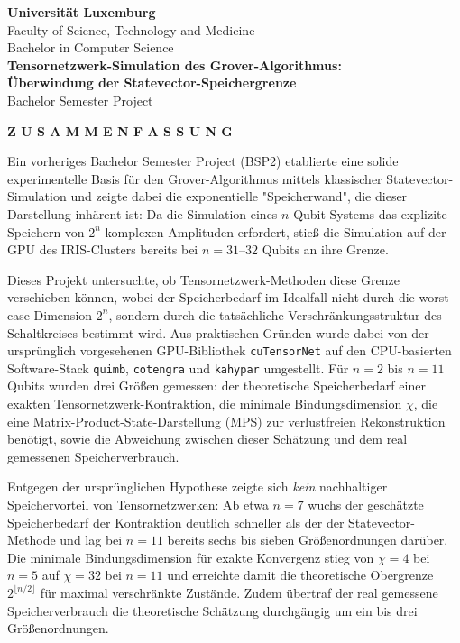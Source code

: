 \documentclass[a4paper,11pt]{article}
\begin{document}
\begin{center}
\textbf{Universität Luxemburg} \\
Faculty of Science, Technology and Medicine \\
Bachelor in Computer Science \\[1em]
\textbf{Tensornetzwerk-Simulation des Grover-Algorithmus: \\
Überwindung der Statevector-Speichergrenze} \\
Bachelor Semester Project
\end{center}

\vspace{1em}
\begin{center}\textbf{Z U S A M M E N F A S S U N G}\end{center}

Ein vorheriges Bachelor Semester Project (BSP2) etablierte eine solide experimentelle Basis für den Grover-Algorithmus mittels klassischer Statevector-Simulation und zeigte dabei die exponentielle "Speicherwand", die dieser Darstellung inhärent ist: Da die Simulation eines $n$-Qubit-Systems das explizite Speichern von $2^n$ komplexen Amplituden erfordert, stieß die Simulation auf der GPU des IRIS-Clusters bereits bei $n=31$–$32$ Qubits an ihre Grenze.

Dieses Projekt untersuchte, ob Tensornetzwerk-Methoden diese Grenze verschieben können, wobei der Speicherbedarf im Idealfall nicht durch die worst-case-Dimension $2^n$, sondern durch die tatsächliche Verschränkungsstruktur des Schaltkreises bestimmt wird. Aus praktischen Gründen wurde dabei von der ursprünglich vorgesehenen GPU-Bibliothek \texttt{cuTensorNet} auf den CPU-basierten Software-Stack \texttt{quimb}, \texttt{cotengra} und \texttt{kahypar} umgestellt. Für $n=2$ bis $n=11$ Qubits wurden drei Größen gemessen: der theoretische Speicherbedarf einer exakten Tensornetzwerk-Kontraktion, die minimale Bindungsdimension $\chi$, die eine Matrix-Product-State-Darstellung (MPS) zur verlustfreien Rekonstruktion benötigt, sowie die Abweichung zwischen dieser Schätzung und dem real gemessenen Speicherverbrauch.

Entgegen der ursprünglichen Hypothese zeigte sich \emph{kein} nachhaltiger Speichervorteil von Tensornetzwerken: Ab etwa $n=7$ wuchs der geschätzte Speicherbedarf der Kontraktion deutlich schneller als der der Statevector-Methode und lag bei $n=11$ bereits sechs bis sieben Größenordnungen darüber. Die minimale Bindungsdimension für exakte Konvergenz stieg von $\chi=4$ bei $n=5$ auf $\chi=32$ bei $n=11$ und erreichte damit die theoretische Obergrenze $2^{\lfloor n/2 \rfloor}$ für maximal verschränkte Zustände. Zudem übertraf der real gemessene Speicherverbrauch die theoretische Schätzung durchgängig um ein bis drei Größenordnungen.
\end{document}
